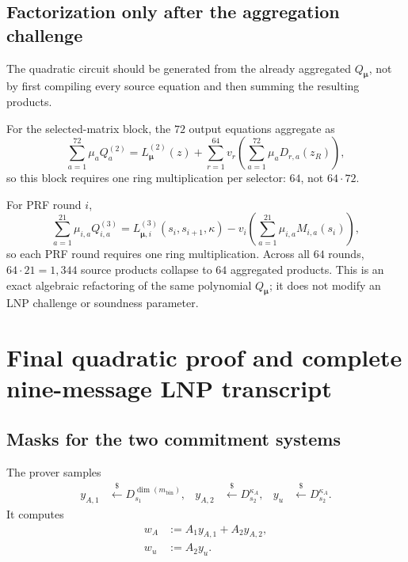 \documentclass[11pt,a4paper]{article}
\newcommand{\getsr}{\xleftarrow{\$}}
\begin{document}
\subsection{Factorization only after the aggregation challenge}

The quadratic circuit should be generated from the already aggregated
\(Q_{\boldsymbol\mu}\), not by first compiling every source equation and then
summing the resulting products.

For the selected-matrix block, the \(72\) output equations aggregate as
\[
 \sum_{a=1}^{72}\mu_aQ^{(2)}_a
 =L^{(2)}_{\boldsymbol\mu}(z)
  +\sum_{r=1}^{64}v_r
    \left(\sum_{a=1}^{72}\mu_aD_{r,a}(z_R)\right),
\]
so this block requires one ring multiplication per selector: \(64\), not
\(64\cdot72\).

For PRF round \(i\),
\[
 \sum_{a=1}^{21}\mu_{i,a}Q^{(3)}_{i,a}
 =L^{(3)}_{\boldsymbol\mu,i}(s_i,s_{i+1},\kappa)
  -v_i\left(\sum_{a=1}^{21}\mu_{i,a}M_{i,a}(s_i)\right),
\]
so each PRF round requires one ring multiplication.  Across all \(64\) rounds,
\(64\cdot21=1{,}344\) source products collapse to \(64\) aggregated products.
This is an exact algebraic refactoring of the same polynomial
\(Q_{\boldsymbol\mu}\); it does not modify an LNP challenge or soundness
parameter.

\section{Final quadratic proof and complete nine-message LNP transcript}

\subsection{Masks for the two commitment systems}

The prover samples
\begin{align*}
 y_{A,1}&\getsr D_{s_1}^{\dim(m_{\mathrm{bin}})},
 &y_{A,2}&\getsr D_{s_2}^{\kappa_A},
 &y_u&\getsr D_{s_2}^{\kappa_A}.
\end{align*}
It computes
\begin{align}
  w_A&:=A_1y_{A,1}+A_2y_{A,2},
  \label{eq:wA}\\
  w_u&:=A_2y_u.
  \label{eq:wu}
\end{align}
\end{document}
